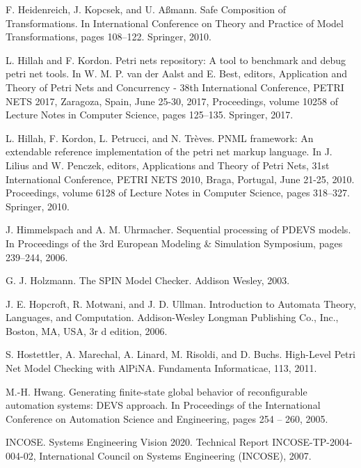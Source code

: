 \begin{description}[style=nextline,leftmargin=12mm,labelwidth=10mm,font=\normalfont]
\item[{[145]}] F. Heidenreich, J. Kopcsek, and U. Aßmann. Safe Composition of Transformations. In International Conference on Theory and Practice of Model Transformations, pages 108–122. Springer, 2010.

\item[{[146]}] L. Hillah and F. Kordon. Petri nets repository: A tool to benchmark and debug petri net tools. In W. M. P. van der Aalst and E. Best, editors, Application and Theory of Petri Nets and Concurrency - 38th International Conference, PETRI NETS 2017, Zaragoza, Spain, June 25-30, 2017, Proceedings, volume 10258 of Lecture Notes in Computer Science, pages 125–135. Springer, 2017.

\item[{[147]}] L. Hillah, F. Kordon, L. Petrucci, and N. Trèves. PNML framework: An extendable reference implementation of the petri net markup language. In J. Lilius and W. Penczek, editors, Applications and Theory of Petri Nets, 31st International Conference, PETRI NETS 2010, Braga, Portugal, June 21-25, 2010. Proceedings, volume 6128 of Lecture Notes in Computer Science, pages 318–327. Springer, 2010.

\item[{[148]}] J. Himmelspach and A. M. Uhrmacher. Sequential processing of PDEVS models. In Proceedings of the 3rd European Modeling \& Simulation Symposium, pages 239–244, 2006.

\item[{[149]}] G. J. Holzmann. The SPIN Model Checker. Addison Wesley, 2003.

\item[{[150]}] J. E. Hopcroft, R. Motwani, and J. D. Ullman. Introduction to Automata Theory, Languages, and Computation. Addison-Wesley Longman Publishing Co., Inc., Boston, MA, USA, 3r d edition, 2006.

\item[{[151]}] S. Hostettler, A. Marechal, A. Linard, M. Risoldi, and D. Buchs. High-Level Petri Net Model Checking with AlPiNA. Fundamenta Informaticae, 113, 2011.

\item[{[152]}] M.-H. Hwang. Generating finite-state global behavior of reconfigurable automation systems: DEVS approach. In Proceedings of the International Conference on Automation Science and Engineering, pages 254 – 260, 2005.

\item[{[153]}] INCOSE. Systems Engineering Vision 2020. Technical Report INCOSE-TP-2004-004-02, International Council on Systems Engineering (INCOSE), 2007.


\end{description}
